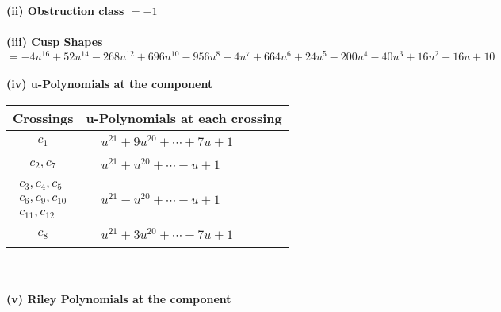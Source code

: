 \documentclass[1p]{elsarticle_modified}
\theoremstyle{definition}
\begin{document}
\flushleft \textbf{(ii) Obstruction class $= -1$}\\~\\
\flushleft \textbf{(iii) Cusp Shapes $= -4 u^{16}+52 u^{14}-268 u^{12}+696 u^{10}-956 u^8-4 u^7+664 u^6+24 u^5-200 u^4-40 u^3+16 u^2+16 u+10$}\\~\\
\newpage\renewcommand{\arraystretch}{1}
\flushleft \textbf{(iv) u-Polynomials at the component}\newline \\
\begin{tabular}{m{50pt}|m{274pt}}
Crossings & \hspace{64pt}u-Polynomials at each crossing \\
\hline $$\begin{aligned}c_{1}\end{aligned}$$&$\begin{aligned}
&u^{21}+9 u^{20}+\cdots+7 u+1
\end{aligned}$\\
\hline $$\begin{aligned}c_{2},c_{7}\end{aligned}$$&$\begin{aligned}
&u^{21}+u^{20}+\cdots- u+1
\end{aligned}$\\
\hline $$\begin{aligned}c_{3},c_{4},c_{5}\\c_{6},c_{9},c_{10}\\c_{11},c_{12}\end{aligned}$$&$\begin{aligned}
&u^{21}- u^{20}+\cdots- u+1
\end{aligned}$\\
\hline $$\begin{aligned}c_{8}\end{aligned}$$&$\begin{aligned}
&u^{21}+3 u^{20}+\cdots-7 u+1
\end{aligned}$\\
\hline
\end{tabular}\\~\\
\newpage\renewcommand{\arraystretch}{1}
\flushleft \textbf{(v) Riley Polynomials at the component}\newline \\
\end{document}
